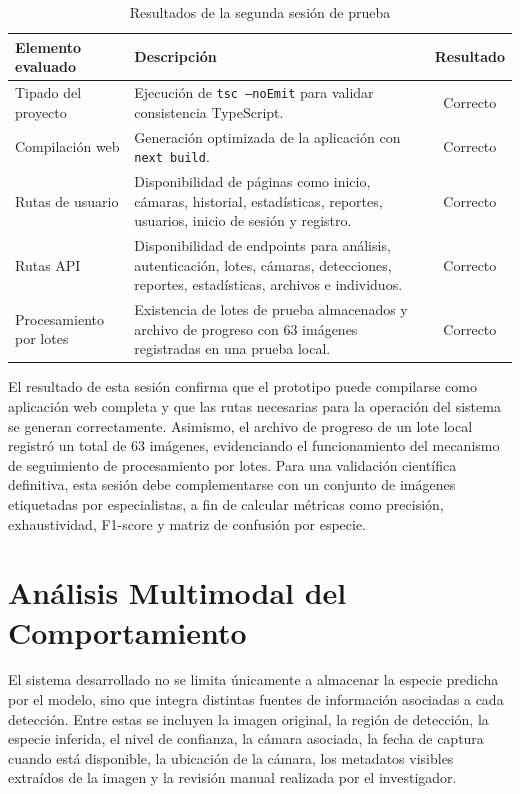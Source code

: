 \begin{table}[H]
\centering
\caption{Resultados de la segunda sesión de prueba}
\label{tab:segunda_sesion_prueba}
\begin{tabularx}{\textwidth}{lXc}
\toprule
\textbf{Elemento evaluado} & \textbf{Descripción} & \textbf{Resultado} \\
\midrule
Tipado del proyecto & Ejecución de \texttt{tsc --noEmit} para validar consistencia TypeScript. & Correcto \\
Compilación web & Generación optimizada de la aplicación con \texttt{next build}. & Correcto \\
Rutas de usuario & Disponibilidad de páginas como inicio, cámaras, historial, estadísticas, reportes, usuarios, inicio de sesión y registro. & Correcto \\
Rutas API & Disponibilidad de endpoints para análisis, autenticación, lotes, cámaras, detecciones, reportes, estadísticas, archivos e individuos. & Correcto \\
Procesamiento por lotes & Existencia de lotes de prueba almacenados y archivo de progreso con 63 imágenes registradas en una prueba local. & Correcto \\
\bottomrule
\end{tabularx}
\end{table}

El resultado de esta sesión confirma que el prototipo puede compilarse como aplicación web completa y que las rutas necesarias para la operación del sistema se generan correctamente. Asimismo, el archivo de progreso de un lote local registró un total de 63 imágenes, evidenciando el funcionamiento del mecanismo de seguimiento de procesamiento por lotes. Para una validación científica definitiva, esta sesión debe complementarse con un conjunto de imágenes etiquetadas por especialistas, a fin de calcular métricas como precisión, exhaustividad, F1-score y matriz de confusión por especie.

\section{Análisis Multimodal del Comportamiento}
\label{sec:analisis_multimodal_comportamiento}

El sistema desarrollado no se limita únicamente a almacenar la especie predicha por el modelo, sino que integra distintas fuentes de información asociadas a cada detección. Entre estas se incluyen la imagen original, la región de detección, la especie inferida, el nivel de confianza, la cámara asociada, la fecha de captura cuando está disponible, la ubicación de la cámara, los metadatos visibles extraídos de la imagen y la revisión manual realizada por el investigador.

